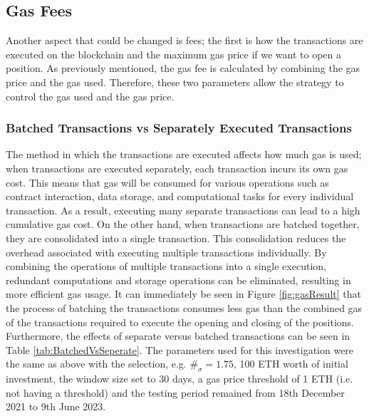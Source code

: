 \subsection{Gas Fees}
Another aspect that could be changed is fees; the first is how the transactions are executed on the blockchain and the maximum gas price if we want to open a position. As previously mentioned, the gas fee is calculated by combining the gas price and the gas used. Therefore, these two parameters allow the strategy to control the gas used and the gas price.

\subsubsection{Batched Transactions vs Separately Executed Transactions}
The method in which the transactions are executed affects how much gas is used; when transactions are executed separately, each transaction incurs its own gas cost. This means that gas will be consumed for various operations such as contract interaction, data storage, and computational tasks for every individual transaction. As a result, executing many separate transactions can lead to a high cumulative gas cost. On the other hand, when transactions are batched together, they are consolidated into a single transaction. This consolidation reduces the overhead associated with executing multiple transactions individually. By combining the operations of multiple transactions into a single execution, redundant computations and storage operations can be eliminated, resulting in more efficient gas usage. It can immediately be seen in Figure \ref{fig:gasResult} that the process of batching the transactions consumes less gas than the combined gas of the transactions required to execute the opening and closing of the positions.
\\[3mm]
Furthermore, the effects of separate versus batched transactions can be seen in Table \ref{tab:BatchedVsSeperate}. The parameters used for this investigation were the same as above with the selection, e.g. $\#_{\sigma} = 1.75$, 100 ETH worth of initial investment, the window size set to 30 days, a gas price threshold of 1 ETH (i.e. not having a threshold) and the testing period remained from 18th December 2021 to 9th June 2023.

